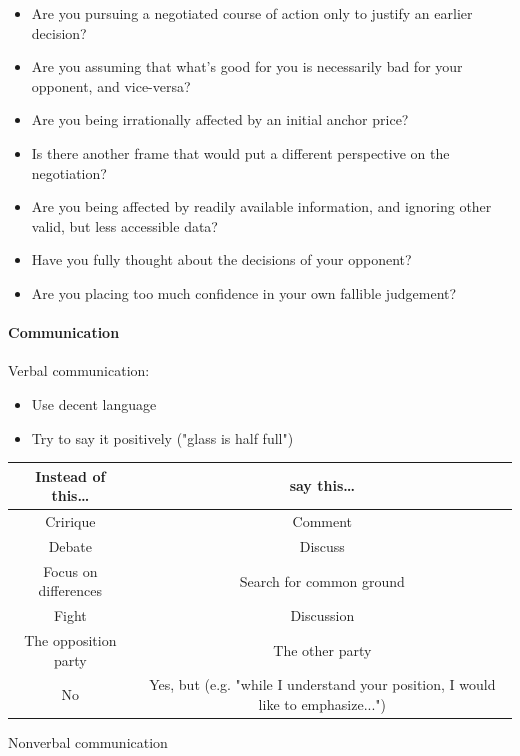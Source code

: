 \begin{itemize}
    \item Are you pursuing a negotiated course of action only to justify an
        earlier decision?
    \item Are you assuming that what's good for you is necessarily bad for your
        opponent, and vice-versa?
    \item Are you being irrationally affected by an initial anchor price?
    \item Is there another frame that would put a different perspective on the
        negotiation?
    \item Are you being affected by readily available information, and ignoring
        other valid, but less accessible data?
    \item Have you fully thought about the decisions of your opponent?
    \item Are you placing too much confidence in your own fallible judgement?
\end{itemize}

\paragraph{Communication}

Verbal communication:
\begin{itemize}
    \item Use decent language
    \item Try to say it positively ("glass is half full")
\end{itemize}

\begin{table}[h]
    \begin{tabular}{c|c}
        Instead of this\dots & say this\dots \\ \hline
        Cririque & Comment \\
        Debate & Discuss \\
        Focus on differences & Search for common ground \\
        Fight & Discussion \\
        The opposition party & The other party \\
        No & Yes, but (e.g. "while I understand your position, I would like to
            emphasize...")
    \end{tabular}
\end{table}

Nonverbal communication

